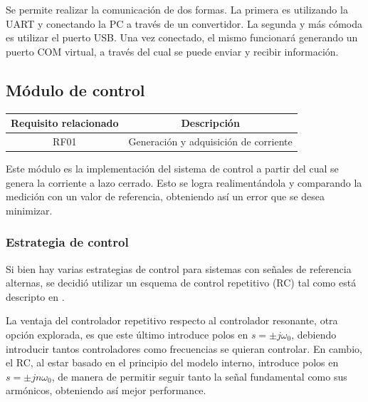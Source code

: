 \documentclass[../et.tex]{subfiles}
\begin{document}
Se permite realizar la comunicación de dos formas. La primera es utilizando la UART y conectando la PC a través de un convertidor. La segunda y más cómoda es utilizar el puerto USB. Una vez conectado, el mismo funcionará generando un puerto COM virtual, a través del cual se puede enviar y recibir información.

\subsection{Módulo de control}
\begin{table}[H]
  \centering
  \begin{tabular}{|c|c|}
    \hline
    \rowcolor[HTML]{C0C0C0}
    Requisito relacionado   & Descripción                                     \\ \hline
    RF01                    & Generación y adquisición de corriente           \\ \hline
  \end{tabular}
\end{table}

Este módulo es la implementación del sistema de control a partir del cual se genera la corriente a lazo cerrado. Esto se logra realimentándola y comparando la medición con un valor de referencia, obteniendo así un error que se desea minimizar.

  \subsubsection{Estrategia de control}
  Si bien hay varias estrategias de control para sistemas con señales de referencia alternas, se decidió utilizar un esquema de control repetitivo (RC) tal como está descripto en \cite{control-lic}.

  La ventaja del controlador repetitivo respecto al controlador resonante, otra opción explorada, es que este último introduce polos en $s = \pm j\omega_0$, debiendo introducir tantos controladores como frecuencias se quieran controlar. En cambio, el RC, al estar basado en el principio del modelo interno, introduce polos en $s = \pm jn\omega_0$, de manera de permitir seguir tanto la señal fundamental como sus armónicos, obteniendo así mejor performance.
\end{document}
